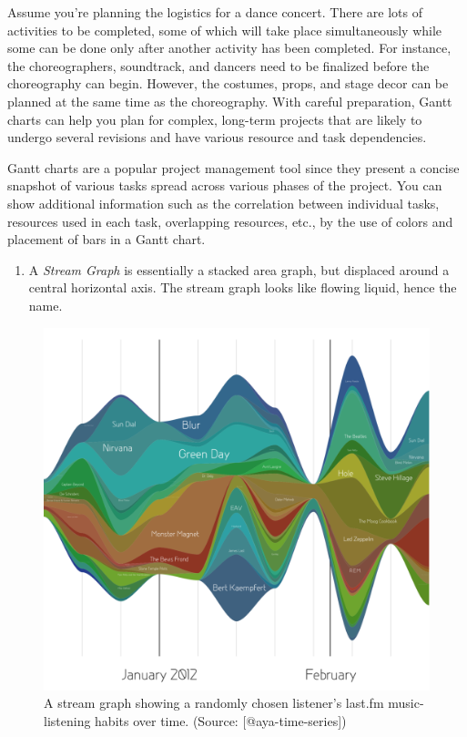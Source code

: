 \documentclass[]{book}
\providecommand{\tightlist}{%
  \setlength{\itemsep}{0pt}\setlength{\parskip}{0pt}}
\theoremstyle{definition}
\theoremstyle{definition}
\theoremstyle{definition}
\theoremstyle{remark}
\begin{document}
Assume you're planning the logistics for a dance concert. There are lots
of activities to be completed, some of which will take place
simultaneously while some can be done only after another activity has
been completed. For instance, the choreographers, soundtrack, and
dancers need to be finalized before the choreography can begin. However,
the costumes, props, and stage decor can be planned at the same time as
the choreography. With careful preparation, Gantt charts can help you
plan for complex, long-term projects that are likely to undergo several
revisions and have various resource and task dependencies.

Gantt charts are a popular project management tool since they present a
concise snapshot of various tasks spread across various phases of the
project. You can show additional information such as the correlation
between individual tasks, resources used in each task, overlapping
resources, etc., by the use of colors and placement of bars in a Gantt
chart.

\begin{enumerate}
\def\labelenumi{\arabic{enumi}.}
\setcounter{enumi}{4}
\tightlist
\item
  A \emph{Stream Graph} is essentially a stacked area graph, but
  displaced around a central horizontal axis. The stream graph looks
  like flowing liquid, hence the name.
\end{enumerate}

\begin{figure}

{\centering \includegraphics[width=0.6\linewidth]{images/aya-stream} 

}

\caption{A stream graph showing a randomly chosen listener's last.fm music-listening habits over time. (Source: [@aya-time-series])}\label{fig:aya-stream}
\end{figure}
\end{document}
